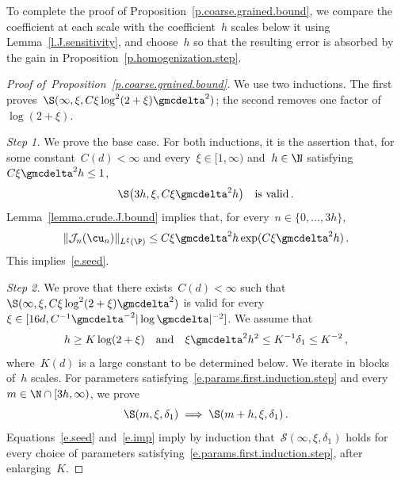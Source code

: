 \documentclass[11pt]{amsart}
\begin{document}
To complete the proof of Proposition~\ref{p.coarse.grained.bound}, we compare the coefficient at each scale with the coefficient~$h$ scales below it using Lemma~\ref{l.J.sensitivity}, and choose~$h$ so that the resulting error is absorbed by the gain in Proposition~\ref{p.homogenization.step}.

\begin{proof}[{Proof of~Proposition~\ref{p.coarse.grained.bound}}]
We use two inductions. The first proves~$\S(\infty,\xi,C\xi\log^2(2+\xi)\gmcdelta^2)$; the second removes one factor of~$\log(2+\xi)$.

\smallskip

\emph{Step 1.} We prove the base case. For both inductions, it is the assertion that, for some constant~$C(d)<\infty$ and every~$\xi\in [1,\infty)$ and~$h \in \N$ satisfying~$C \xi \gmcdelta^2 h \leq 1$,
\begin{equation}
	\S\bigl( 3 h, \xi, C \xi \gmcdelta^2 h\bigr) \quad \text{is valid}\,.
	\label{e.seed}
\end{equation}
Lemma~\ref{lemma.crude.J.bound} implies that, for every~$n\in\{0,\ldots,3h\}$,
\begin{equation*}
	\|\mathcal J_n(\cu_n)\|_{L^\xi(\P)}
	\leq C\xi\gmcdelta^2h\exp(C\xi\gmcdelta^2h)\,.
\end{equation*}
This implies~\eqref{e.seed}.

\smallskip

\emph{Step 2.} We prove that there exists~$C(d)<\infty$ such that~$\S(\infty,\xi,C\xi\log^2(2+\xi)\gmcdelta^2)$ is valid for every~$\xi\in[16d,C^{-1}\gmcdelta^{-2}|\log\gmcdelta|^{-2}]$. We assume that
\begin{equation}
	h \geq K \log(2+\xi)
	\quad \text{and} \quad
	\xi \gmcdelta^2  h^2 \leq K^{-1} \delta_1 \leq K^{-2} \,,
	\label{e.params.first.induction.step}
\end{equation}
where~$K(d)$ is a large constant to be determined below. We iterate in blocks of~$h$ scales. For parameters satisfying~\eqref{e.params.first.induction.step} and every~$m\in\N \cap [3 h,\infty)$, we prove
\begin{equation}
	\S(m, \xi, \delta_1)
	\implies
	\S(m+ h, \xi,\delta_1)
	\,.
	\label{e.imp}
\end{equation}
Equations~\eqref{e.seed} and~\eqref{e.imp} imply by induction that~$\mathcal S(\infty,\xi,\delta_1)$ holds for every choice of parameters satisfying~\eqref{e.params.first.induction.step}, after enlarging~$K$.

\smallskip


\end{proof}
\end{document}
